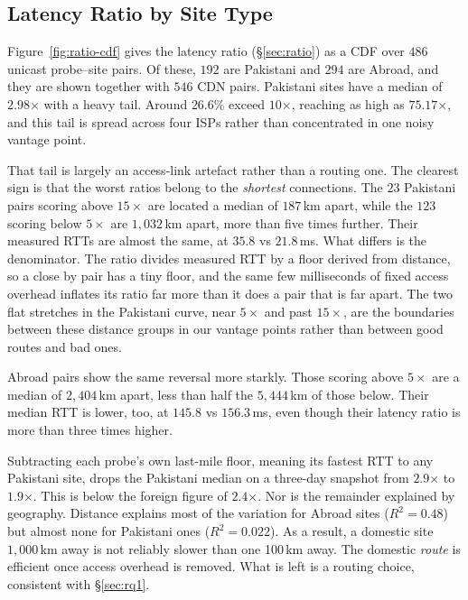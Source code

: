 \documentclass[sigconf,anonymous,10pt]{acmart}
\begin{document}
 
\subsection{Latency Ratio by Site Type}
\label{sec:prelim-ratio}
Figure~\ref{fig:ratio-cdf} gives the latency ratio (\S\ref{sec:ratio}) as a CDF over $486$ unicast probe--site pairs. Of these, $192$ are Pakistani and $294$ are Abroad, and they are shown together with $546$ CDN pairs. Pakistani sites have a median of $2.98$$\times$ with a heavy tail. Around $26.6$\% exceed $10$$\times$, reaching as high as $75.17$$\times$, and this tail is spread across four ISPs rather than concentrated in one noisy vantage point.

That tail is largely an access-link artefact rather than a routing one. The clearest sign is that the worst ratios belong to the \emph{shortest} connections. The $23$ Pakistani pairs scoring above $15\times$ are located a median of $187$\,km apart, while the $123$ scoring below $5\times$ are $1{,}032$\,km apart, more than five times further. Their measured RTTs are almost the same, at $35.8$ vs $21.8$\,ms. What differs is the denominator. The ratio divides measured RTT by a floor derived from distance, so a close by pair has a tiny floor, and the same few milliseconds of fixed access overhead inflates its ratio far more than it does a pair that is far apart. The two flat stretches in the Pakistani curve, near $5\times$ and past $15\times$, are the boundaries between these distance groups in our vantage points rather than between good routes and bad ones.

Abroad pairs show the same reversal more starkly. Those scoring above $5\times$ are a median of $2{,}404$\,km apart, less than half the $5{,}444$\,km of those below. Their median RTT is lower, too, at $145.8$ vs $156.3$\,ms, even though their latency ratio is more than three times higher.

Subtracting each probe's own last-mile floor, meaning its fastest RTT to any Pakistani site, drops the Pakistani median on a three-day snapshot from $2.9$$\times$ to $1.9$$\times$. This is below the foreign figure of $2.4$$\times$. Nor is the remainder explained by geography. Distance explains most of the variation for Abroad sites ($R^2=0.48$) but almost none for Pakistani ones ($R^2=0.022$). As a result, a domestic site $1,000$\,km away is not reliably slower than one 100\,km away. The domestic \emph{route} is efficient once access overhead is removed. What is left is a routing choice, consistent with \S\ref{sec:rq1}.
\end{document}
